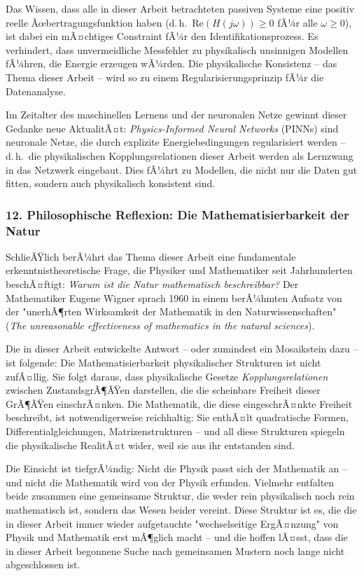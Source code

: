 ﻿\documentclass[12pt, a4paper]{article}
\begin{document}
	Das Wissen, dass alle in dieser Arbeit betrachteten passiven Systeme eine positiv reelle Ãœbertragungsfunktion haben (d.\,h.\ $\mathrm{Re}(H(j\omega)) \geq 0$ fÃ¼r alle $\omega \geq 0$), ist dabei ein mÃ¤chtiges Constraint fÃ¼r den Identifikationsprozess. Es verhindert, dass unvermeidliche Messfehler zu physikalisch unsinnigen Modellen fÃ¼hren, die Energie erzeugen wÃ¼rden. Die physikalische Konsistenz -- das Thema dieser Arbeit -- wird so zu einem Regularisierungsprinzip fÃ¼r die Datenanalyse.

	Im Zeitalter des maschinellen Lernens und der neuronalen Netze gewinnt dieser Gedanke neue AktualitÃ¤t: \textit{Physics-Informed Neural Networks} (PINNs) sind neuronale Netze, die durch explizite Energiebedingungen regularisiert werden -- d.\,h.\ die physikalischen Kopplungsrelationen dieser Arbeit werden als Lernzwang in das Netzwerk eingebaut. Dies fÃ¼hrt zu Modellen, die nicht nur die Daten gut fitten, sondern auch physikalisch konsistent sind.

	\subsubsection*{12. \quad Philosophische Reflexion: Die Mathematisierbarkeit der Natur}

	SchlieÃŸlich berÃ¼hrt das Thema dieser Arbeit eine fundamentale erkenntnistheoretische Frage, die Physiker und Mathematiker seit Jahrhunderten beschÃ¤ftigt: \textit{Warum ist die Natur mathematisch beschreibbar?} Der Mathematiker Eugene Wigner sprach 1960 in einem berÃ¼hmten Aufsatz von der "unerhÃ¶rten Wirksamkeit der Mathematik in den Naturwissenschaften" (\textit{The unreasonable effectiveness of mathematics in the natural sciences}).

	Die in dieser Arbeit entwickelte Antwort -- oder zumindest ein Mosaikstein dazu -- ist folgende: Die Mathematisierbarkeit physikalischer Strukturen ist nicht zufÃ¤llig. Sie folgt daraus, dass physikalische Gesetze \textit{Kopplungsrelationen} zwischen ZustandsgrÃ¶ÃŸen darstellen, die die scheinbare Freiheit dieser GrÃ¶ÃŸen einschrÃ¤nken. Die Mathematik, die diese eingeschrÃ¤nkte Freiheit beschreibt, ist notwendigerweise reichhaltig: Sie enthÃ¤lt quadratische Formen, Differentialgleichungen, Matrizenstrukturen -- und all diese Strukturen spiegeln die physikalische RealitÃ¤t wider, weil sie aus ihr entstanden sind.

	Die Einsicht ist tiefgrÃ¼ndig: Nicht die Physik passt sich der Mathematik an -- und nicht die Mathematik wird von der Physik erfunden. Vielmehr entfalten beide zusammen eine gemeinsame Struktur, die weder rein physikalisch noch rein mathematisch ist, sondern das Wesen beider vereint. Diese Struktur ist es, die die in dieser Arbeit immer wieder aufgetauchte "wechselseitige ErgÃ¤nzung" von Physik und Mathematik erst mÃ¶glich macht -- und die hoffen lÃ¤sst, dass die in dieser Arbeit begonnene Suche nach gemeinsamen Mustern noch lange nicht abgeschlossen ist.
\end{document}
